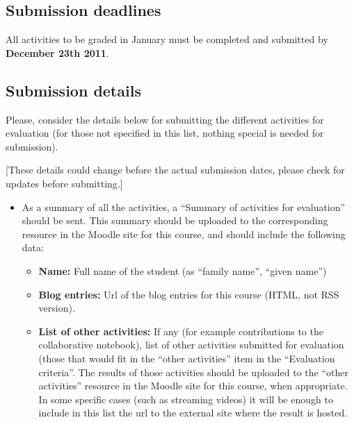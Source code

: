 \documentclass[a4paper]{article}
\begin{document}
\subsection{Submission deadlines}

All activities to be graded in January must be completed and submitted by \textbf{December 23th 2011}.


\subsection{Submission details}

Please, consider the details below for submitting the different activities for evaluation (for those not specified in this list, nothing special is needed for submission).

[These details could change before the actual submission dates, please check for updates before submitting.]

\begin{itemize}
\item As a summary of all the activities, a ``Summary of activities for evaluation'' should be sent. This summary should be uploaded to the corresponding resource in the Moodle site for this course, and should include the following data:
  \begin{itemize}
  \item \textbf{Name:} Full name of the student (as ``family name'', ``given name'')
  \item \textbf{Blog entries:} Url of the blog entries for this course (HTML, not RSS version).
  \item \textbf{List of other activities:} If any (for example contributions to the collaborative notebook), list of other activities submitted for evaluation (those that would fit in the ``other activities'' item in the ``Evaluation criteria''. The results of those activities should be uploaded to the ``other activities'' resource in the Moodle site for this course, when appropriate. In some specific cases (such as streaming videos) it will be enough to include in this list the url to the external site where the result is hosted.
  \end{itemize}
\end{itemize}
\end{document}
